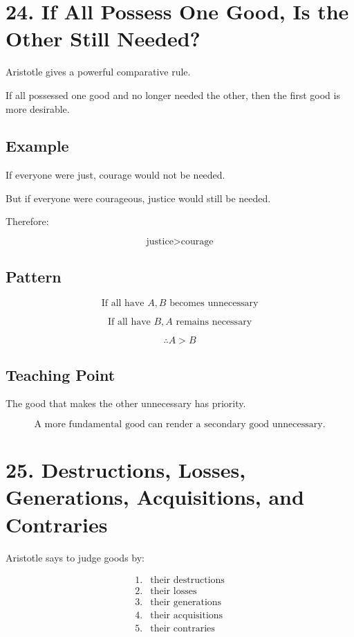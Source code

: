 \documentclass[12pt]{article}
\begin{document}
\section*{24. If All Possess One Good, Is the Other Still Needed?}

Aristotle gives a powerful comparative rule.

If all possessed one good and no longer needed the other, then the first good is
more desirable.

\subsection*{Example}

If everyone were just, courage would not be needed.

But if everyone were courageous, justice would still be needed.

Therefore:

\[
\text{justice} > \text{courage}
\]

\subsection*{Pattern}

\[
\text{If all have } A, B \text{ becomes unnecessary}
\]

\[
\text{If all have } B, A \text{ remains necessary}
\]

\[
\therefore A > B
\]

\subsection*{Teaching Point}

The good that makes the other unnecessary has priority.

\[
\boxed{
\text{A more fundamental good can render a secondary good unnecessary.}
}
\]

\section*{25. Destructions, Losses, Generations, Acquisitions, and Contraries}

Aristotle says to judge goods by:

\[
\begin{array}{ll}
1. & \text{their destructions} \\
2. & \text{their losses} \\
3. & \text{their generations} \\
4. & \text{their acquisitions} \\
5. & \text{their contraries}
\end{array}
\]
\end{document}
